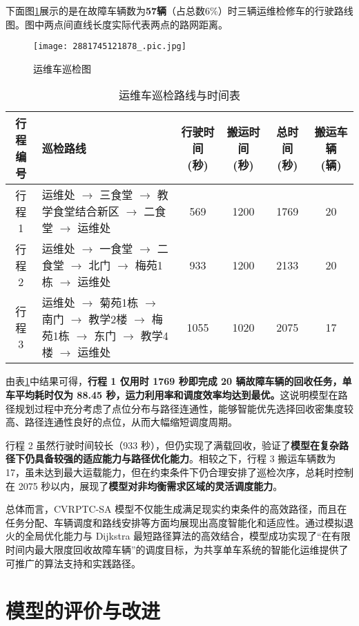 \documentclass[withoutpreface,bwprint]{cumcmthesis}
\begin{document}
下面图\ref{fig:运维车巡检图}展示的是在故障车辆数为\textbf{57辆}（占总数6\%）时三辆运维检修车的行驶路线图。图中两点间直线长度实际代表两点的路网距离。
\begin{figure}[H]
  \centering
  \texttt{[image: 2881745121878\_.pic.jpg]} %
  \caption{运维车巡检图} 
  \label{fig:运维车巡检图}
\end{figure}

\begin{table}[H]
\centering
\caption{运维车巡检路线与时间表}
\label{tab:运维车巡检路线与时间表}
\begin{tabular}{|c|p{5cm}|c|c|c|c|}
\hline
\textbf{行程编号} & \textbf{巡检路线} & \textbf{行驶时间 (秒)} & \textbf{搬运时间 (秒)} & \textbf{总时间 (秒)} & \textbf{搬运车辆 (辆)} \\
\hline
行程 1 & 运维处 $\to$ 三食堂 $\to$ 教学食堂结合新区 $\to$ 二食堂 $\to$ 运维处 & 569 & 1200 & 1769 & 20 \\
\hline
行程 2 & 运维处 $\to$ 一食堂 $\to$ 二食堂 $\to$ 北门 $\to$ 梅苑1栋 $\to$ 运维处 & 933 & 1200 & 2133 & 20 \\
\hline
行程 3 & 运维处 $\to$ 菊苑1栋 $\to$ 南门 $\to$ 教学2楼 $\to$ 梅苑1栋 $\to$ 东门 $\to$ 教学4楼 $\to$ 运维处 & 1055 & 1020 & 2075 & 17 \\
\hline
\end{tabular}
\end{table}

由表\ref{tab:运维车巡检路线与时间表}中结果可得，\textbf{行程 1 仅用时 1769 秒即完成 20 辆故障车辆的回收任务，单车平均耗时仅为 88.45 秒，运力利用率和调度效率均达到最优。}这说明模型在路径规划过程中充分考虑了点位分布与路径连通性，能够智能优先选择回收密集度较高、路径连通性良好的点位，从而大幅缩短调度周期。

行程 2 虽然行驶时间较长（933 秒），但仍实现了满载回收，验证了\textbf{模型在复杂路径下仍具备较强的适应能力与路径优化能力}。相较之下，行程 3 搬运车辆数为 17，虽未达到最大运载能力，但在约束条件下仍合理安排了巡检次序，总耗时控制在 2075 秒以内，展现了\textbf{模型对非均衡需求区域的灵活调度能力}。

总体而言，CVRPTC-SA 模型不仅能生成满足现实约束条件的高效路径，而且在任务分配、车辆调度和路线安排等方面均展现出高度智能化和适应性。通过模拟退火的全局优化能力与 Dijkstra 最短路径算法的高效结合，模型成功实现了“在有限时间内最大限度回收故障车辆”的调度目标，为共享单车系统的智能化运维提供了可推广的算法支持和实践路径。

\section{模型的评价与改进}
\end{document}

